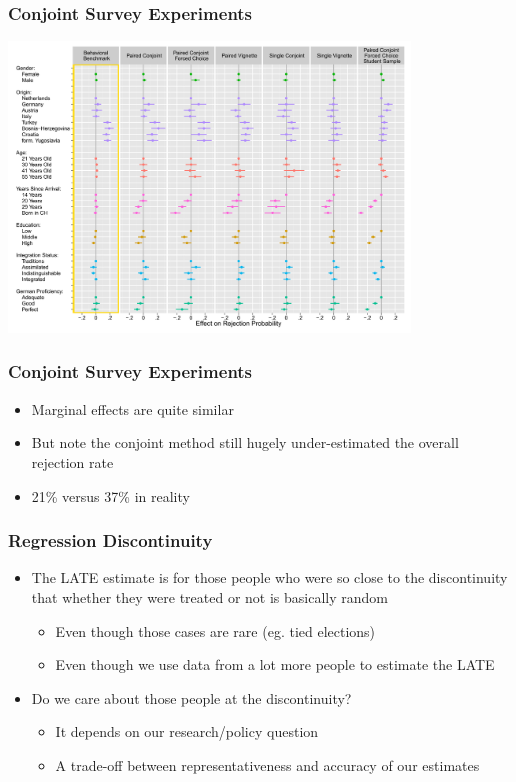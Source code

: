\documentclass[xcolor=x11names,compress]{beamer}\usepackage[]{graphicx}\usepackage[]{xcolor}
\renewcommand{\(}{\begin{columns}}
\renewcommand{\)}{\end{columns}}
\newcommand{\<}[1]{\begin{column}{#1}}
\renewcommand{\>}{\end{column}}
\begin{document}
\begin{frame}
\frametitle{Conjoint Survey Experiments}
\includegraphics[width=0.8\textwidth]{Conjoint_Swiss.png}
\end{frame}

\begin{frame}
\frametitle{Conjoint Survey Experiments}
\begin{itemize}
\item Marginal effects are quite similar
\pause
\item But note the conjoint method still hugely under-estimated the overall rejection rate
\item 21\% versus 37\% in reality
\end{itemize}
\end{frame}

\begin{frame}
\frametitle{Regression Discontinuity}
\begin{itemize}
\item The LATE estimate is for those people who were so close to the discontinuity that whether they were treated or not is basically random
\pause
\begin{itemize}
\item Even though those cases are rare (eg. tied elections)
\pause
\item Even though we use data from a lot more people to estimate the LATE
\pause
\end{itemize}
\item Do we care about those people at the discontinuity?
\pause
\begin{itemize}
\item It depends on our research/policy question
\pause
\item A trade-off between representativeness and accuracy of our estimates
\end{itemize}
\end{itemize}
\end{frame}
\end{document}
